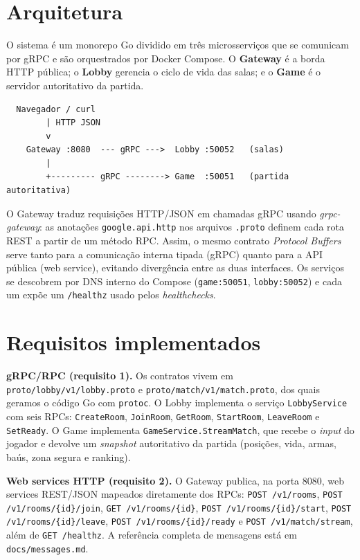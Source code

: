 \documentclass[12pt]{article}
\begin{document}
\section{Arquitetura}

O sistema é um monorepo Go dividido em três microsserviços que se comunicam por gRPC e são
orquestrados por Docker Compose. O \textbf{Gateway} é a borda HTTP pública; o \textbf{Lobby}
gerencia o ciclo de vida das salas; e o \textbf{Game} é o servidor autoritativo da partida.

\begin{verbatim}
  Navegador / curl
        | HTTP JSON
        v
    Gateway :8080  --- gRPC --->  Lobby :50052   (salas)
        |
        +--------- gRPC --------> Game  :50051   (partida autoritativa)
\end{verbatim}

O Gateway traduz requisições HTTP/JSON em chamadas gRPC usando \textit{grpc-gateway}: as
anotações \texttt{google.api.http} nos arquivos \texttt{.proto} definem cada rota REST a partir
de um método RPC. Assim, o mesmo contrato \textit{Protocol Buffers} serve tanto para a
comunicação interna tipada (gRPC) quanto para a API pública (web service), evitando divergência
entre as duas interfaces. Os serviços se descobrem por DNS interno do Compose
(\texttt{game:50051}, \texttt{lobby:50052}) e cada um expõe um \texttt{/healthz} usado pelos
\textit{healthchecks}.

\section{Requisitos implementados}

\textbf{gRPC/RPC (requisito 1).} Os contratos vivem em \texttt{proto/lobby/v1/lobby.proto} e
\texttt{proto/match/v1/match.proto}, dos quais geramos o código Go com \texttt{protoc}. O Lobby
implementa o serviço \texttt{LobbyService} com seis RPCs: \texttt{CreateRoom}, \texttt{JoinRoom},
\texttt{GetRoom}, \texttt{StartRoom}, \texttt{LeaveRoom} e \texttt{SetReady}. O Game implementa
\texttt{GameService.StreamMatch}, que recebe o \textit{input} do jogador e devolve um
\textit{snapshot} autoritativo da partida (posições, vida, armas, baús, zona segura e ranking).

\textbf{Web services HTTP (requisito 2).} O Gateway publica, na porta 8080, web services REST/JSON
mapeados diretamente dos RPCs: \texttt{POST /v1/rooms}, \texttt{POST /v1/rooms/\{id\}/join},
\texttt{GET /v1/rooms/\{id\}}, \texttt{POST /v1/rooms/\{id\}/start},
\texttt{POST /v1/rooms/\{id\}/leave}, \texttt{POST /v1/rooms/\{id\}/ready} e
\texttt{POST /v1/match/stream}, além de \texttt{GET /healthz}. A referência completa de mensagens
está em \texttt{docs/messages.md}.
\end{document}
